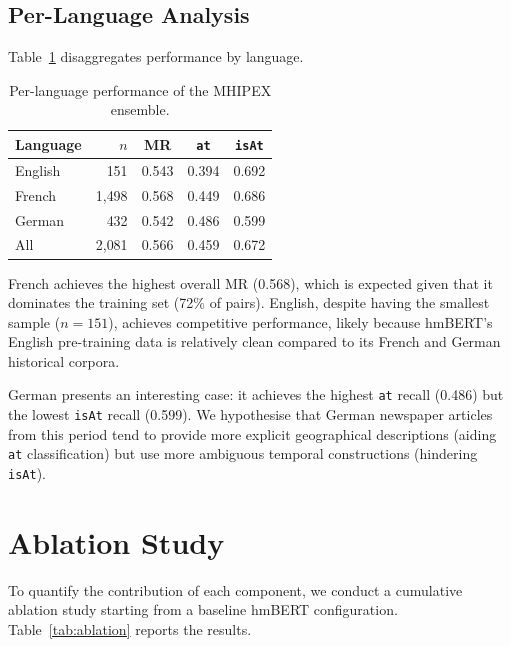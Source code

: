 \subsection{Per-Language Analysis}

Table~\ref{tab:lang} disaggregates performance by language.

\begin{table}[t]
\centering
\caption{Per-language performance of the MHIPEX ensemble.}
\label{tab:lang}
\begin{tabular}{lrccc}
\toprule
\textbf{Language} & $n$ & \textbf{MR} & \textbf{\texttt{at}} & \textbf{\texttt{isAt}} \\
\midrule
English & 151 & 0.543 & 0.394 & 0.692 \\
French & 1{,}498 & 0.568 & 0.449 & 0.686 \\
German & 432 & 0.542 & 0.486 & 0.599 \\
\midrule
All & 2{,}081 & 0.566 & 0.459 & 0.672 \\
\bottomrule
\end{tabular}
\end{table}

French achieves the highest overall MR (0.568), which is expected given that it dominates the training set (72\% of pairs). English, despite having the smallest sample ($n=151$), achieves competitive performance, likely because hmBERT's English pre-training data is relatively clean compared to its French and German historical corpora.

German presents an interesting case: it achieves the highest \texttt{at} recall (0.486) but the lowest \texttt{isAt} recall (0.599). We hypothesise that German newspaper articles from this period tend to provide more explicit geographical descriptions (aiding \texttt{at} classification) but use more ambiguous temporal constructions (hindering \texttt{isAt}).

\section{Ablation Study}
\label{sec:ablation}

To quantify the contribution of each component, we conduct a cumulative ablation study starting from a baseline hmBERT configuration. Table~\ref{tab:ablation} reports the results.

